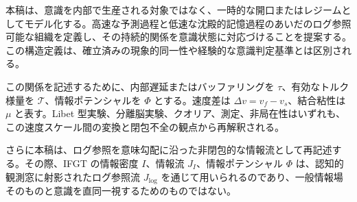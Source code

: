 
本稿は、意識を内部で生産される対象ではなく、一時的な開口またはレジームとしてモデル化する。高速な予測過程と低速な沈殿的記憶過程のあいだのログ参照可能な組織を定義し、その持続的関係を意識状態に対応づけることを提案する。この構造定義は、確立済みの現象的同一性や経験的な意識判定基準とは区別される。

この関係を記述するために、内部遅延またはバッファリングを $\tau$、有効なトルク様量を $\mathcal{T}$、情報ポテンシャルを $\Phi$ とする。速度差は $\Delta v = v_f - v_s$、結合粘性は $\mu$ と表す。Libet 型実験、分離脳実験、クオリア、測定、非局在性はいずれも、この速度スケール間の変換と閉包不全の観点から再解釈される。

さらに本稿は、ログ参照を意味勾配に沿った非閉包的な情報流として再記述する。その際、IFGT の情報密度 $I$、情報流 $J_I$、情報ポテンシャル $\Phi$ は、認知的観測窓に射影されたログ参照流 $J_{\log}$ を通じて用いられるのであり、一般情報場そのものと意識を直同一視するためのものではない。
